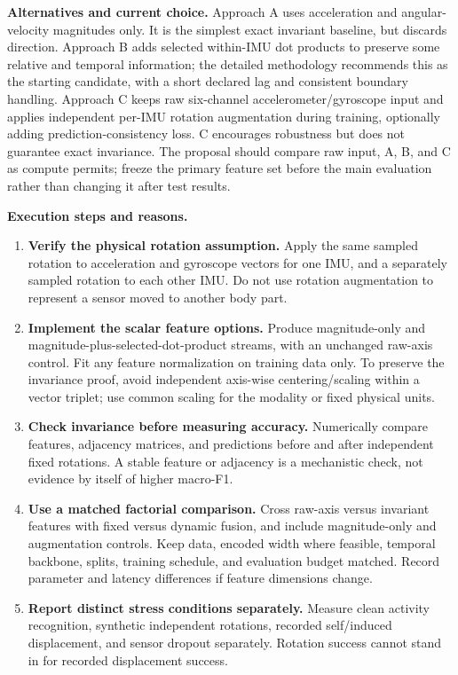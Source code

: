 \documentclass[10pt,a4paper]{article}
\begin{document}
\textbf{Alternatives and current choice.} Approach A uses acceleration and angular-velocity magnitudes only. It is the simplest exact invariant baseline, but discards direction. Approach B adds selected within-IMU dot products to preserve some relative and temporal information; the detailed methodology recommends this as the starting candidate, with a short declared lag and consistent boundary handling. Approach C keeps raw six-channel accelerometer/gyroscope input and applies independent per-IMU rotation augmentation during training, optionally adding prediction-consistency loss. C encourages robustness but does not guarantee exact invariance. The proposal should compare raw input, A, B, and C as compute permits; freeze the primary feature set before the main evaluation rather than changing it after test results.

\textbf{Execution steps and reasons.}
\begin{enumerate}
\item \textbf{Verify the physical rotation assumption.} Apply the same sampled rotation to acceleration and gyroscope vectors for one IMU, and a separately sampled rotation to each other IMU. Do not use rotation augmentation to represent a sensor moved to another body part.
\item \textbf{Implement the scalar feature options.} Produce magnitude-only and magnitude-plus-selected-dot-product streams, with an unchanged raw-axis control. Fit any feature normalization on training data only. To preserve the invariance proof, avoid independent axis-wise centering/scaling within a vector triplet; use common scaling for the modality or fixed physical units.
\item \textbf{Check invariance before measuring accuracy.} Numerically compare features, adjacency matrices, and predictions before and after independent fixed rotations. A stable feature or adjacency is a mechanistic check, not evidence by itself of higher macro-F1.
\item \textbf{Use a matched factorial comparison.} Cross raw-axis versus invariant features with fixed versus dynamic fusion, and include magnitude-only and augmentation controls. Keep data, encoded width where feasible, temporal backbone, splits, training schedule, and evaluation budget matched. Record parameter and latency differences if feature dimensions change.
\item \textbf{Report distinct stress conditions separately.} Measure clean activity recognition, synthetic independent rotations, recorded self/induced displacement, and sensor dropout separately. Rotation success cannot stand in for recorded displacement success.
\end{enumerate}
\end{document}
